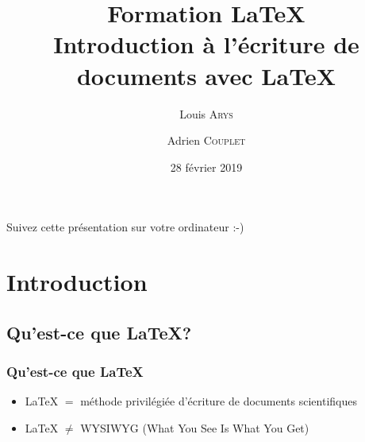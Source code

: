 \documentclass[10pt,svgnames,usenames,table]{beamer} %
\institute{Louvain-li-Nux}
\title{\textbf{Formation \LaTeX}\\
Introduction à l'écriture de documents avec \LaTeX}
\author{Louis \textsc{Arys} \and Adrien \textsc{Couplet}}
\date{28 février 2019}
\begin{document}
\begin{frame}
  \begin{center}\Large
  Suivez cette présentation sur votre ordinateur :-)
  
  \vspace{1cm}
  \end{center}
\end{frame}


\begin{frame}
  \maketitle  

\end{frame}


\section{Introduction}
\subsection{Qu'est-ce que \LaTeX{}?}
\begin{frame}
\frametitle{Qu'est-ce que \LaTeX}

\begin{itemize}
\item \LaTeX{} $=$ méthode privilégiée d'écriture de documents scientifiques
 \vspace{0.5cm}
\item \LaTeX{} $ \neq$ WYSIWYG (What You See Is What You Get)
\end{itemize}

\end{frame}
\end{document}
